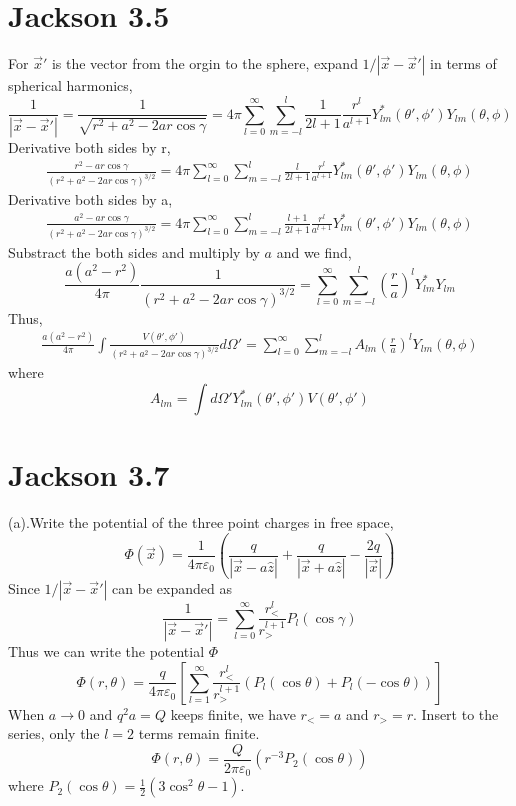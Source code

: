 \documentclass{article}
\begin{document}
\section*{Jackson 3.5}
For $\vec x'$ is the vector from the orgin to the sphere, expand $1/|\vec x-\vec x'|$ in terms of spherical harmonics,
\[ \frac{1}{|\vec x-\vec x'|}=\frac{1}{\sqrt{r^2+a^2-2ar\cos\gamma}}=4\pi\sum^\infty_{l=0}\sum^{l}_{m=-l}\frac{1}{2l+1}\frac{r^l}{a^{l+1}}Y^*_{lm}(\theta',\phi')Y_{lm}(\theta,\phi) \]
Derivative both sides by r,
\begin{align*}
  \frac{r^2-ar\cos\gamma}{(r^2+a^2-2ar\cos\gamma)^{3/2}}=4\pi\sum^\infty_{l=0}\sum^{l}_{m=-l}\frac{l}{2l+1}\frac{r^l}{a^{l+1}}Y^*_{lm}(\theta',\phi')Y_{lm}(\theta,\phi)
\end{align*}
Derivative both sides by a,
\begin{align*}
  \frac{a^2-ar\cos\gamma}{(r^2+a^2-2ar\cos\gamma)^{3/2}}=4\pi\sum^\infty_{l=0}\sum^l_{m=-l}\frac{l+1}{2l+1}\frac{r^l}{a^{l+1}}Y^*_{lm}(\theta',\phi')Y_{lm}(\theta,\phi)
\end{align*}
Substract the both sides and multiply by $a$ and we find,
\[ \frac{a(a^2-r^2)}{4\pi}\frac{1}{(r^2+a^2-2ar\cos\gamma)^{3/2}}=\sum^\infty_{l=0}\sum^l_{m=-l}(\frac{r}{a})^lY^*_{lm}Y_{lm} \]
Thus,
\begin{align*}
  \frac{a(a^2-r^2)}{4\pi}\int\frac{V(\theta',\phi')}{(r^2+a^2-2ar\cos\gamma)^{3/2}}d\Omega'=\sum^\infty_{l=0}\sum^l_{m=-l}A_{lm}(\frac ra)^lY_{lm}(\theta,\phi)
\end{align*}
where
\[ A_{lm}=\int d\Omega'Y^*_{lm}(\theta',\phi')V(\theta',\phi') \]




\pagebreak
\section*{Jackson 3.7}

(a).Write the potential of the three point charges in free space,
\[ \Phi(\vec x)=\frac{1}{4\pi\varepsilon_0}(\frac{q}{|\vec x-a\hat z|}+\frac{q}{|\vec x+a\hat z|}-\frac{2q}{|\vec x|})\]
Since $1/|\vec x-\vec x'|$ can be expanded as
\[ \frac{1}{|\vec x-\vec x'|}=\sum^\infty_{l=0}\frac{r_<^l}{r_>^{l+1}}P_l(\cos\gamma) \]
Thus we can write the potential $\Phi$
\[ \boxed{\Phi(r,\theta)=\frac{q}{4\pi\varepsilon_0}[\sum^\infty_{l=1}\frac{r_<^l}{r_>^{l+1}}(P_l(\cos\theta)+P_l(-\cos\theta))]} \]
When $a\rightarrow 0$ and $q^2a=Q$ keeps finite, we have $r_<=a$ and $r_>=r$. Insert to the series, only the $l=2$  terms remain finite.
\[\boxed{\Phi(r,\theta)=\frac{Q}{2\pi\varepsilon_0}(r^{-3} P_2 (\cos\theta))} \]
where $P_2(\cos\theta)=\frac{1}{2}(3\cos^2\theta-1)$.\par
\end{document}
